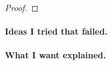 \documentclass[11pt]{article}
\begin{document}

\begin{answer}
\end{answer}

\begin{proof}
\end{proof}

\paragraph{Ideas I tried that failed.}

\paragraph{What I want explained.}
\end{document}
